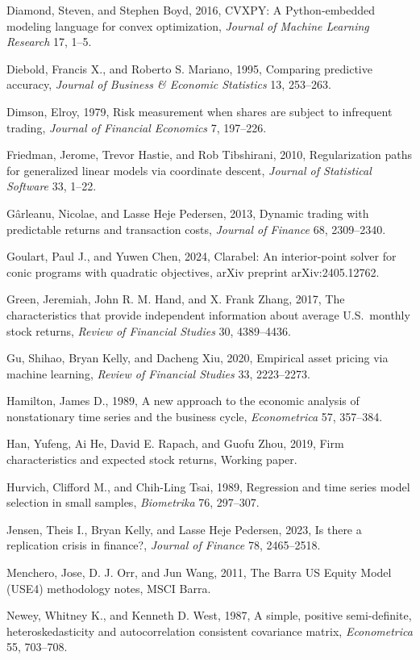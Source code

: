 \documentclass[10pt,twocolumn,letterpaper]{article}
\begin{document}
\begin{list}{}{\setlength{\leftmargin}{1.3em}\setlength{\itemindent}{-1.3em}\setlength{\itemsep}{1.0pt}\setlength{\parsep}{0pt}}
\item Diamond, Steven, and Stephen Boyd, 2016, CVXPY: A Python-embedded modeling language for convex optimization, \textit{Journal of Machine Learning Research} 17, 1--5.
\item Diebold, Francis X., and Roberto S. Mariano, 1995, Comparing predictive accuracy, \textit{Journal of Business \& Economic Statistics} 13, 253--263.
\item Dimson, Elroy, 1979, Risk measurement when shares are subject to infrequent trading, \textit{Journal of Financial Economics} 7, 197--226.
\item Friedman, Jerome, Trevor Hastie, and Rob Tibshirani, 2010, Regularization paths for generalized linear models via coordinate descent, \textit{Journal of Statistical Software} 33, 1--22.
\item G\^arleanu, Nicolae, and Lasse Heje Pedersen, 2013, Dynamic trading with predictable returns and transaction costs, \textit{Journal of Finance} 68, 2309--2340.
\item Goulart, Paul J., and Yuwen Chen, 2024, Clarabel: An interior-point solver for conic programs with quadratic objectives, arXiv preprint arXiv:2405.12762.
\item Green, Jeremiah, John R. M. Hand, and X. Frank Zhang, 2017, The characteristics that provide independent information about average U.S.\ monthly stock returns, \textit{Review of Financial Studies} 30, 4389--4436.
\item Gu, Shihao, Bryan Kelly, and Dacheng Xiu, 2020, Empirical asset pricing via machine learning, \textit{Review of Financial Studies} 33, 2223--2273.
\item Hamilton, James D., 1989, A new approach to the economic analysis of nonstationary time series and the business cycle, \textit{Econometrica} 57, 357--384.
\item Han, Yufeng, Ai He, David E. Rapach, and Guofu Zhou, 2019, Firm characteristics and expected stock returns, Working paper.
\item Hurvich, Clifford M., and Chih-Ling Tsai, 1989, Regression and time series model selection in small samples, \textit{Biometrika} 76, 297--307.
\item Jensen, Theis I., Bryan Kelly, and Lasse Heje Pedersen, 2023, Is there a replication crisis in finance?, \textit{Journal of Finance} 78, 2465--2518.
\item Menchero, Jose, D. J. Orr, and Jun Wang, 2011, The Barra US Equity Model (USE4) methodology notes, MSCI Barra.
\item Newey, Whitney K., and Kenneth D. West, 1987, A simple, positive semi-definite, heteroskedasticity and autocorrelation consistent covariance matrix, \textit{Econometrica} 55, 703--708.

\end{list}
\end{document}
